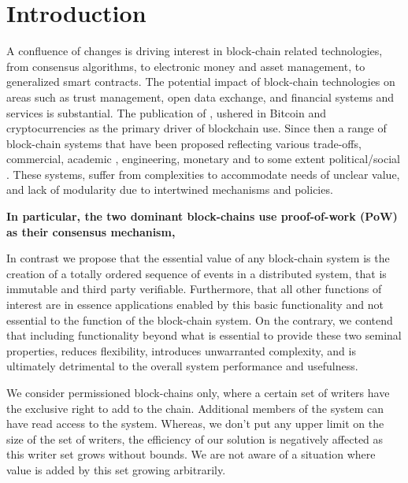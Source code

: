 \documentclass[10pt]{article}
\begin{document}
\newpage

\tableofcontents

\newpage

\setcounter{page}{1}

\section{Introduction}
 
A confluence of changes is driving interest in block-chain related technologies, from consensus algorithms, to electronic money and asset management, to generalized smart contracts. The potential impact of block-chain technologies on areas such as trust management, open data exchange, and financial systems and services is substantial. The publication of \cite{satoshi-paper}, ushered in Bitcoin and cryptocurrencies as the primary driver of blockchain use. Since then a range of block-chain systems that have been proposed reflecting various trade-offs, commercial, academic , engineering, monetary and to some extent political/social \cite{satoshi-paper, hyperledger, byzantine, ethereum}. These systems, suffer from complexities to accommodate needs of unclear value, and lack of modularity due to intertwined mechanisms and policies. 

\textbf{In particular, the two dominant block-chains \cite{satoshi-paper, ethereum} use proof-of-work (PoW) as their consensus mechanism,   }


In contrast we propose that the essential value of any block-chain system is the creation of a totally ordered sequence of events in a distributed system, that is immutable and third party verifiable. Furthermore, that all other functions of interest are in essence applications enabled by this basic functionality and not essential to the function of the block-chain system. On the contrary, we contend that including functionality beyond what is essential to provide these two seminal properties, reduces flexibility, introduces unwarranted complexity, and is ultimately detrimental to the overall system performance and usefulness.


We consider permissioned block-chains only, where a certain set of writers have the exclusive right to add to the chain. Additional members of the system can have read access to the system. Whereas, we don't put any upper limit on the size of the set of writers, the efficiency of our solution is negatively affected as this writer set grows without bounds. We are not aware of a situation where value is added by this set growing arbitrarily. 
\end{document}
